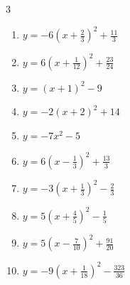 \begin{multicols}{3}
\begin{enumerate}
  \item $\displaystyle y=-6\left( x+\frac{2}{3}\right)^{2}+\frac{11}{3}$


  \item $\displaystyle y=6\left( x+\frac{1}{12}\right)^{2}+\frac{23}{24}$


  \item $\displaystyle y=\left( x+1\right)^{2}-9$

        \phantom{$\displaystyle 頂点\left( -1 , -9 \right)$}

  \item $\displaystyle y=-2\left( x+2\right)^{2}+14$

        \phantom{$\displaystyle 頂点\left( -2 , 14 \right)$}

  \item $\displaystyle y=-7x^{2}-5$

        \phantom{$\displaystyle 頂点\left( 0 , -5 \right)$}

\columnbreak %

  \item $\displaystyle y=6\left( x-\frac{1}{3}\right)^{2}+\frac{13}{3}$


  \item $\displaystyle y=-3\left( x+\frac{1}{3}\right)^{2}-\frac{2}{3}$


  \item $\displaystyle y=5\left( x+\frac{4}{5}\right)^{2}-\frac{1}{5}$


  \item $\displaystyle y=5\left( x-\frac{7}{10}\right)^{2}+\frac{91}{20}$


  \item $\displaystyle y=-9\left( x+\frac{1}{18}\right)^{2}-\frac{323}{36}$



\end{enumerate}
\end{multicols}
